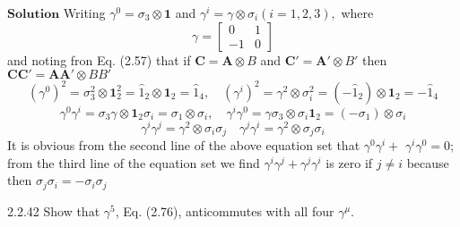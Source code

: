 $\boxed{\textbf{Solution}}$  Writing $\gamma^{0}=\sigma_{3} \otimes \mathbf{1}$ and $\gamma^{i}=\gamma \otimes \sigma_{i}(i=1,2,3),$ where
$$
\gamma=\begin{bmatrix}{0} & {1} \\ {-1} & {0}\end{bmatrix}
$$
and noting fron Eq. (2.57) that if $\mathbf{C}=\mathbf{A} \otimes B$ and $\mathbf{C}'=\mathbf{A}' \otimes B'$ then
$\mathbf{C} \mathbf{C}'=\mathbf{A} \mathbf{A}' \otimes B B'$
$$\left(\gamma^{0}\right)^{2}=\sigma_{3}^{2} \otimes \mathbf{1}_{2}^{2}=\hat{1}_{2} \otimes \mathbf{1}_{2}=\hat{1}_{4}, \quad\left(\gamma^{i}\right)^{2}=\gamma^{2} \otimes \sigma_{i}^{2}=\left(-\hat{1}_{2}\right) \otimes \mathbf{1}_{2}=-\hat{1}_{4}$$
$$\gamma^{0} \gamma^{i}=\sigma_{3} \gamma \otimes \mathbf{1}_{2} \sigma_{i}=\sigma_{1} \otimes \sigma_{i}, \quad \gamma^{i} \gamma^{0}=\gamma \sigma_{3} \otimes \sigma_{i} \mathbf{1}_{2}=\left(-\sigma_{1}\right) \otimes \sigma_{i}$$
$$\gamma^{i} \gamma^{j}=\gamma^{2} \otimes \sigma_{i} \sigma_{j} \quad \gamma^{j} \gamma^{i}=\gamma^{2} \otimes \sigma_{j} \sigma_{i}$$
It is obvious from the second line of the above equation set that $\gamma^{0} \gamma^{i}+$
$\gamma^{i} \gamma^{0}=0 ;$ from the third line of the equation set we find $\gamma^{i} \gamma^{j}+\gamma^{j} \gamma^{i}$ is zero if $j \neq i$ because then $\sigma_{j} \sigma_{i}=-\sigma_{i} \sigma_{j}$

\newpage

\begin{mybox}{2.2.42}
Show that $\gamma^{5}$, Eq. (2.76), anticommutes with all four $\gamma^{\mu}$.
\end{mybox}


